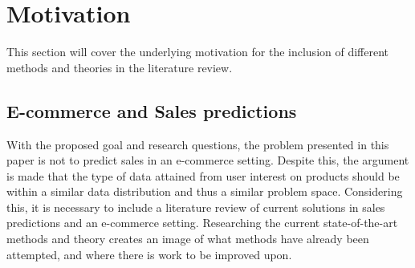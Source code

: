 \section{Motivation}
\label{section:BT:Motivation}

This section will cover the underlying motivation for the inclusion of different methods and theories in the literature review.



\subsection{E-commerce and Sales predictions}
With the proposed goal and research questions, the problem presented in this paper is not to predict sales in an e-commerce setting.
Despite this, the argument is made that the type of data attained from user interest on products should be within a similar data distribution and thus a similar problem space.
Considering this, it is necessary to include a literature review of current solutions in sales predictions and an e-commerce setting.
Researching the current state-of-the-art methods and theory creates an image of what methods have already been attempted,
and where there is work to be improved upon. 


